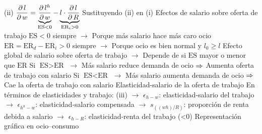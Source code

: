 \documentclass{nuevotema}
\begin{document}
\begin{esquemal}
				\4[] (ii) $\dfrac{\partial \, l}{\partial \, w} = \underbrace{\dfrac{\partial \, l^h}{\partial \, w}}_{\text{ES}<0} - \underbrace{l \cdot \dfrac{\partial \, l}{\partial \, R}}_{\text{ER}_i>0}$
				\4[] Sustituyendo (ii) en (i)
				\4[] 
				\4 Efectos de salario sobre oferta de trabajo
				\4[] $\text{ES}<0$ siempre
				\4[] $\to$ Porque más salario hace más caro ocio
				\4[] $\text{ER} = \text{ER}_d - \text{ER}_i > 0$ siempre
				\4[] $\to$ Porque ocio es bien normal y $l_0 \geq l$
				\4[] Efecto global de salario sobre oferta de trabajo
				\4[] $\to$ Depende de si $\text{ES}$ mayor o menor que $\text{ER}$
				\4[] Si $\text{ES} > \text{ER}$
				\4[] $\to$ Más salario reduce demanda de ocio
				\4[] $\Rightarrow$ Aumenta oferta de trabajo con salario
				\4[] Si $\text{ES} < \text{ER}$
				\4[] $\to$ Más salario aumenta demanda de ocio
				\4[] $\Rightarrow$ Cae la oferta de trabajo con salario
				\4 Elasticidad-salario de la oferta de trabajo
				\4[] En términos de elasticidades y trabajo:
				\4[] (iii) 
				\4[] $\to$ $\epsilon_{h-w}$: elasticidad-salario del trabajo
				\4[] $\to$ $\epsilon_{h^h-w}$: elasticidad-salario compensada
				\4[] $\to$ $s_{((wh)/R)}$: proporción de renta debida a salario
				\4[] $\to$ $\epsilon_{h-R}$: elasticidad-renta del trabajo (<0)
				\4[] Representación gráfica en ocio--consumo
				\4[] 

\end{esquemal}
\end{document}
